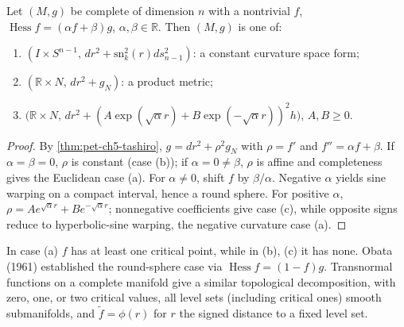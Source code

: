 \begin{theorem}[global classification for $\operatorname{Hess}f=(\alpha f+\beta)g$]
  \label{thm:pet-ch5-hessian-classification}
  Let $(M,g)$ be complete of dimension $n$ with a nontrivial $f$,
  $\operatorname{Hess}f=(\alpha f+\beta)g$, $\alpha,\beta\in\mathbb R$. Then
  $(M,g)$ is one of:
  \begin{enumerate}
  \item[(a)] $(I\times S^{n-1},\,dr^2+\mathrm{sn}_k^2(r)ds_{n-1}^2)$: a constant
  curvature space form;
  \item[(b)] $(\mathbb R\times N,\,dr^2+g_N)$: a product metric;
  \item[(c)] $\big(\mathbb R\times N,\,dr^2+(A\exp(\sqrt\alpha r)+B\exp(-\sqrt\alpha r))^2h\big)$,
  $A,B\ge0$.
  \end{enumerate}
\end{theorem}
\begin{proof}
  \sketch
  By \cref{thm:pet-ch5-tashiro}, $g=dr^2+\rho^2g_N$ with
  $\rho=f'$ and $f''=\alpha f+\beta$.  If $\alpha=\beta=0$, $\rho$ is constant
  (case (b)); if $\alpha=0\ne\beta$, $\rho$ is affine and completeness gives the
  Euclidean case (a).  For $\alpha\ne0$, shift $f$ by $\beta/\alpha$.  Negative
  $\alpha$ yields sine warping on a compact interval, hence a round sphere.  For
  positive $\alpha$,
  $\rho=Ae^{\sqrt\alpha r}+Be^{-\sqrt\alpha r}$; nonnegative coefficients give
  case (c), while opposite signs reduce to hyperbolic-sine warping, the negative
  curvature case (a).
\end{proof}

\begin{remark}
  \label{rem:pet-ch5-obata-transnormal}
  In case (a) $f$ has at least one critical point, while in (b), (c) it has none.
  Obata (1961) established the round-sphere case via $\operatorname{Hess}f=(1-f)g$.
  Transnormal functions on a complete manifold give a similar topological
  decomposition, with zero, one, or two critical values, all level sets (including
  critical ones) smooth submanifolds, and $\tilde f=\phi(r)$ for $r$ the signed
  distance to a fixed level set.
\end{remark}


